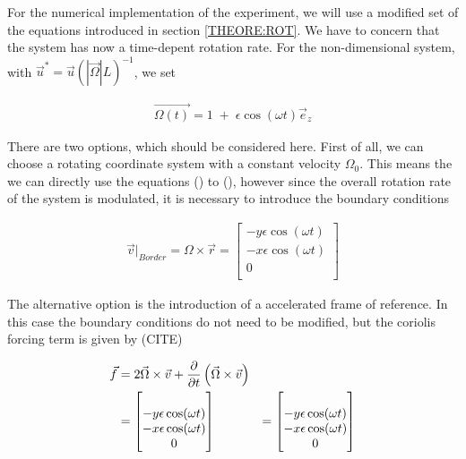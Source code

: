 For the numerical implementation of the experiment, we will use a modified set of the equations
introduced in section \ref{THEORE:ROT}.
We have to concern that the system has now a time-depent rotation rate.
For the non-dimensional system, with $\vec{u}^* =  \vec{u} (|\vec{\Omega}|L)^{-1}$, we set

\begin{align}
    \vec{\Omega(t)} = 1 \; + \; \epsilon \cos(\omega t)\vec{e}_z
\end{align}

There are two options, which should be considered here.
First of all, we can choose a rotating coordinate system with a constant velocity $\Omega_0$.
This means the we can directly use the equations () to (), however since the overall rotation rate of the system is
modulated, it is necessary to introduce the boundary conditions

\begin{align}
    \vec{v}|_{Border}  = \Omega \times \vec{r} = \begin{bmatrix}
           -y \epsilon \cos(\omega t) \\
           -x \epsilon \cos(\omega t) \\
           0\\
         \end{bmatrix}
\end{align}

The alternative option is the introduction of a accelerated frame of reference.
In this case the boundary conditions do not need to be modified, but the coriolis forcing term is given by (CITE)

\begin{align}
    \vec{f} &= 2 \vec{\Omega} \times \vec{v} + \pdn[]{t}\left(\vec{\Omega} \times \vec{v} \right) \\
            &= \begin{bmatrix}\\
           -y \epsilon \cos(\omega t) \\
           -x \epsilon \cos(\omega t) \\
           0\\
         \end{bmatrix}
            &= \begin{bmatrix}\\
           -y \epsilon \cos(\omega t) \\
           -x \epsilon \cos(\omega t) \\
           0\\
         \end{bmatrix}
\end{align}

